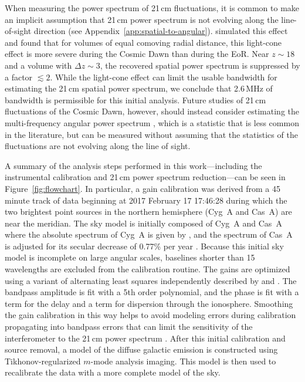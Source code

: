 \documentclass[twocolumn]{aastex62}
\begin{document}
When measuring the power spectrum of 21\,cm fluctuations, it is common to make an implicit
assumption that 21\,cm power spectrum is not evolving along the line-of-sight direction (see
Appendix~\ref{app:spatial-to-angular}).  \citet{2018MNRAS.477.3217G} simulated this effect and found
that for volumes of equal comoving radial distance, this light-cone effect is more severe during the
Cosmic Dawn than during the EoR.  Near $z \sim 18$ and a volume with $\Delta z \sim 3$, the
recovered spatial power spectrum is suppressed by a factor $\lesssim 2$. While the light-cone effect
can limit the usable bandwidth for estimating the 21\,cm spatial power spectrum, we conclude that
2.6\,MHz of bandwidth is permissible for this initial analysis. Future studies of 21\,cm
fluctuations of the Cosmic Dawn, however, should instead consider estimating the multi-frequency
angular power spectrum \citep{2007MNRAS.378..119D}, which is a statistic that is less common in the
literature, but can be measured without assuming that the statistics of the fluctuations are not
evolving along the line of sight.

A summary of the analysis steps performed in this work---including the instrumental calibration and
21\,cm power spectrum reduction---can be seen in Figure~\ref{fig:flowchart}.  In particular, a gain
calibration was derived from a 45\,minute track of data beginning at 2017 February 17 17:46:28
during which the two brightest point sources in the northern hemisphere (Cyg~A and Cas~A) are near
the meridian. The sky model is initially composed of Cyg~A and Cas~A where the absolute spectrum of
Cyg~A is given by \citet{1977A&A....61...99B}, and the spectrum of Cas~A is adjusted for its secular
decrease of 0.77\% per year \citep{2009AJ....138..838H}. Because this initial sky model is
incomplete on large angular scales, baselines shorter than 15 wavelengths are excluded from the
calibration routine.  The gains are optimized using a variant of alternating least squares
independently described by \citet{2008ISTSP...2..707M} and \citet{2014A&A...571A..97S}.  The
bandpass amplitude is fit with a 5th order polynomial, and the phase is fit with a term for the
delay and a term for dispersion through the ionosphere. Smoothing the gain calibration in this way
helps to avoid modeling errors during calibration propagating into bandpass errors that can limit
the sensitivity of the interferometer to the 21\,cm power spectrum \citep{2016MNRAS.461.3135B,
2017MNRAS.470.1849E}. After this initial calibration and source removal, a model of the diffuse
galactic emission is constructed using Tikhonov-regularized $m$-mode analysis imaging. This model is
then used to recalibrate the data with a more complete model of the sky.
\end{document}
